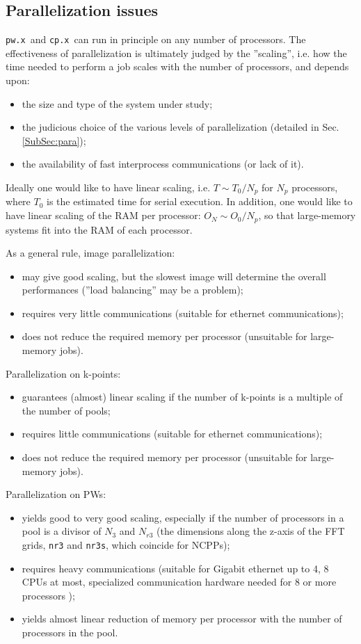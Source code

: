 \documentclass[12pt,a4paper]{article}
\def\pw.x{\texttt{pw.x}}
\def\cp.x{\texttt{cp.x}}
\begin{document}
\subsection{Parallelization issues}
\label{SubSec:badpara}

\pw.x\ and \cp.x\ can run in principle on any number of processors.
The effectiveness of parallelization is ultimately judged by the 
''scaling'', i.e. how the time needed to perform a job scales
 with the number of processors, and depends upon:
\begin{itemize}
\item the size and type of the system under study;
\item the judicious choice of the various levels of parallelization 
(detailed in Sec.\ref{SubSec:para});
\item the availability of fast interprocess communications (or lack of it).
\end{itemize}
Ideally one would like to have linear scaling, i.e. $T \sim T_0/N_p$ for 
$N_p$ processors, where $T_0$ is the estimated time for serial execution.
 In addition, one would like to have linear scaling of
the RAM per processor: $O_N \sim O_0/N_p$, so that large-memory systems
fit into the RAM of each processor.

As a general rule, image parallelization:
\begin{itemize}
\item  may give good scaling, but the slowest image will determine
the overall performances (''load balancing'' may be a problem);
\item requires very little communications (suitable for ethernet 
communications);
\item does not reduce the required memory per processor (unsuitable for 
large-memory jobs).
\end{itemize}
Parallelization on k-points:
\begin{itemize}
\item guarantees (almost) linear scaling if the number of k-points
is a multiple of the number of pools;
\item requires little communications (suitable for ethernet communications);
\item does not reduce the required memory per processor (unsuitable for 
large-memory jobs).
\end{itemize}
Parallelization on PWs:
\begin{itemize}
\item yields good to very good scaling, especially if the number of processors
in a pool is a divisor of $N_3$ and $N_{r3}$ (the dimensions along the z-axis 
of the FFT grids, \texttt{nr3} and \texttt{nr3s}, which coincide for NCPPs);
\item requires heavy communications (suitable for Gigabit ethernet up to 
4, 8 CPUs at most, specialized communication hardware needed for 8 or more
processors );
\item yields almost linear reduction of memory per processor with the number
of processors in the pool.
\end{itemize}
\end{document}
